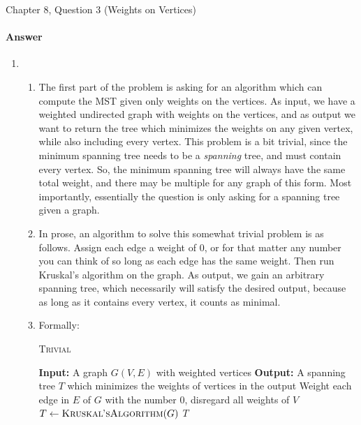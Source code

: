 \documentclass{article}
\begin{document}
\nextprob
{}

Chapter 8, Question 3 (Weights on Vertices)

\paragraph{Answer}

\begin{enumerate}
	\item 
		\begin{enumerate}
			\item The first part of the problem is asking for an algorithm which can compute the MST given
				only weights on the vertices. As input, we have a weighted undirected graph with weights
				on the vertices, and as output we want to return the tree which minimizes the weights on
				any given vertex, while also including every vertex. This problem is a bit trivial, since
				the minimum spanning tree needs to be a \textit{spanning} tree, and must contain every vertex.
				So, the minimum spanning tree will always have the same total weight, and there may be multiple for
				any graph of this form. Most importantly, essentially the question is only asking for a spanning
				tree given a graph.
			\item In prose, an algorithm to solve this somewhat trivial problem is as follows. Assign each edge a weight of
				$0$, or for that matter any number you can think of so long as each edge has the same weight. Then run
				Kruskal's algorithm on the graph. As output, we gain an arbitrary spanning tree, which necessarily will
				satisfy the desired output, because as long as it contains every vertex, it counts as minimal.
			\item Formally:
		\begin{algorithm}
			\begin{algorithmic}
				\caption{\textsc{Trivial}}
				\State \textbf{Input:} A graph $G(V,E)$ with weighted vertices
				\State \textbf{Output:} A spanning tree $T$ which minimizes the weights of vertices in the output
				\State Weight each edge in $E$ of $G$ with the number $0$, disregard all weights of $V$
				\State $T \gets \textsc{Kruskal'sAlgorithm}(G)$
				\State \Return $T$
			\end{algorithmic}
		\end{algorithm}


\end{enumerate}
\end{enumerate}
\end{document}
